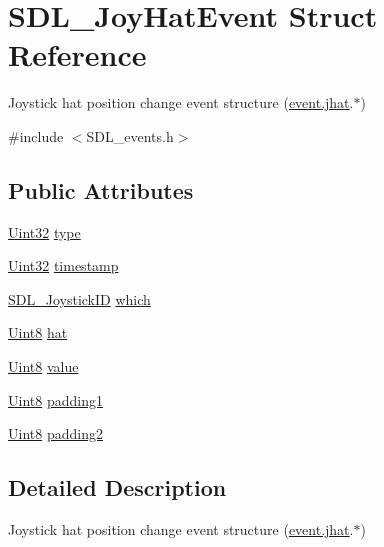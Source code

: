 \hypertarget{struct_s_d_l___joy_hat_event}{\section{S\-D\-L\-\_\-\-Joy\-Hat\-Event Struct Reference}
\label{struct_s_d_l___joy_hat_event}
}


Joystick hat position change event structure (\hyperlink{union_s_d_l___event_a421b40e0f8e01f181c8d5548cff1dd1d}{event.\-jhat}.$\ast$)  




{\ttfamily \#include $<$S\-D\-L\-\_\-events.\-h$>$}

\subsection*{Public Attributes}
\begin{DoxyCompactItemize}
\item 
\hyperlink{_s_d_l__stdinc_8h_add440eff171ea5f55cb00c4a9ab8672d}{Uint32} \hyperlink{struct_s_d_l___joy_hat_event_ac583dafab46c44354e210a542aff57cc}{type}
\item 
\hyperlink{_s_d_l__stdinc_8h_add440eff171ea5f55cb00c4a9ab8672d}{Uint32} \hyperlink{struct_s_d_l___joy_hat_event_ade58ecb3e75aad4ef9809f040519a021}{timestamp}
\item 
\hyperlink{_s_d_l__joystick_8h_a3c3d32500cb08f76ee8077983912c0bd}{S\-D\-L\-\_\-\-Joystick\-I\-D} \hyperlink{struct_s_d_l___joy_hat_event_ac9d9bb179f9116d16b3da47cacd74b55}{which}
\item 
\hyperlink{_s_d_l__stdinc_8h_a2944638813a090aa23e62f4da842c3e2}{Uint8} \hyperlink{struct_s_d_l___joy_hat_event_ab1b54a6d1091e583e856f86b5af1e2f6}{hat}
\item 
\hyperlink{_s_d_l__stdinc_8h_a2944638813a090aa23e62f4da842c3e2}{Uint8} \hyperlink{struct_s_d_l___joy_hat_event_a52b179a34407449941b61d988ca72ef4}{value}
\item 
\hyperlink{_s_d_l__stdinc_8h_a2944638813a090aa23e62f4da842c3e2}{Uint8} \hyperlink{struct_s_d_l___joy_hat_event_afbe72b6702cf7f70ccbe206737ab2e49}{padding1}
\item 
\hyperlink{_s_d_l__stdinc_8h_a2944638813a090aa23e62f4da842c3e2}{Uint8} \hyperlink{struct_s_d_l___joy_hat_event_adaca3e99773130ae456690ba83feb420}{padding2}
\end{DoxyCompactItemize}


\subsection{Detailed Description}
Joystick hat position change event structure (\hyperlink{union_s_d_l___event_a421b40e0f8e01f181c8d5548cff1dd1d}{event.\-jhat}.$\ast$) 

